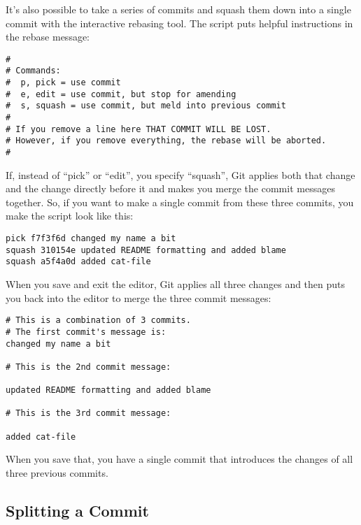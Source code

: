 \documentclass[a4paper]{book}
\begin{document}
It's also possible to take a series of commits and squash them down into a single commit with the interactive rebasing tool. The script puts helpful instructions in the rebase message:

\begin{shaded}\begin{verbatim}
#
# Commands:
#  p, pick = use commit
#  e, edit = use commit, but stop for amending
#  s, squash = use commit, but meld into previous commit
#
# If you remove a line here THAT COMMIT WILL BE LOST.
# However, if you remove everything, the rebase will be aborted.
#
\end{verbatim}\end{shaded}

If, instead of “pick” or “edit”, you specify “squash”, Git applies both that change and the change directly before it and makes you merge the commit messages together. So, if you want to make a single commit from these three commits, you make the script look like this:

\begin{shaded}\begin{verbatim}
pick f7f3f6d changed my name a bit
squash 310154e updated README formatting and added blame
squash a5f4a0d added cat-file
\end{verbatim}\end{shaded}

When you save and exit the editor, Git applies all three changes and then puts you back into the editor to merge the three commit messages:

\begin{shaded}\begin{verbatim}
# This is a combination of 3 commits.
# The first commit's message is:
changed my name a bit

# This is the 2nd commit message:

updated README formatting and added blame

# This is the 3rd commit message:

added cat-file
\end{verbatim}\end{shaded}

When you save that, you have a single commit that introduces the changes of all three previous commits.

\subsection{Splitting a Commit}
\end{document}
